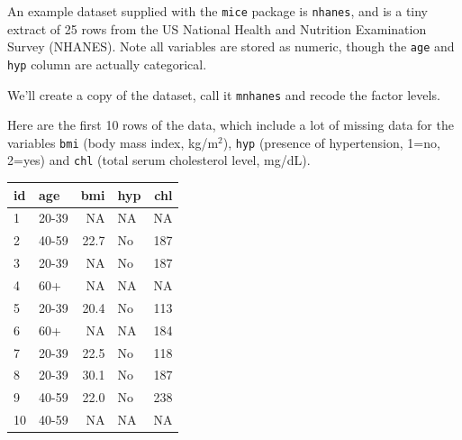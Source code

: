 \documentclass[
]{book}
\newenvironment{Shaded}{\begin{snugshade}}{\end{snugshade}}
\newcommand{\AttributeTok}[1]{\textcolor[rgb]{0.13,0.29,0.53}{#1}}
\newcommand{\DecValTok}[1]{\textcolor[rgb]{0.00,0.00,0.81}{#1}}
\newcommand{\FunctionTok}[1]{\textcolor[rgb]{0.13,0.29,0.53}{\textbf{#1}}}
\newcommand{\NormalTok}[1]{#1}
\newcommand{\OtherTok}[1]{\textcolor[rgb]{0.56,0.35,0.01}{#1}}
\newcommand{\SpecialCharTok}[1]{\textcolor[rgb]{0.81,0.36,0.00}{\textbf{#1}}}
\newcommand{\StringTok}[1]{\textcolor[rgb]{0.31,0.60,0.02}{#1}}
\begin{document}
An example dataset supplied with the \texttt{mice} package is \texttt{nhanes}, and is a tiny
extract of 25 rows from the US National Health and Nutrition Examination Survey
(NHANES). Note all variables are stored as numeric, though the \texttt{age} and \texttt{hyp} column
are actually categorical.

We'll create a copy of the dataset, call it \texttt{mnhanes} and recode the factor levels.

\begin{Shaded}
\end{Shaded}

Here are the first 10 rows of the data, which include a lot of missing
data for the variables \texttt{bmi} (body mass index, kg/m\(^2\)), \texttt{hyp} (presence of hypertension, 1=no, 2=yes)
and \texttt{chl} (total serum cholesterol level, mg/dL).

\begin{table}
\centering
\begin{tabular}[t]{l|l|r|l|r}
\hline
id & age & bmi & hyp & chl\\
\hline
1 & 20-39 & NA & NA & NA\\
\hline
2 & 40-59 & 22.7 & No & 187\\
\hline
3 & 20-39 & NA & No & 187\\
\hline
4 & 60+ & NA & NA & NA\\
\hline
5 & 20-39 & 20.4 & No & 113\\
\hline
6 & 60+ & NA & NA & 184\\
\hline
7 & 20-39 & 22.5 & No & 118\\
\hline
8 & 20-39 & 30.1 & No & 187\\
\hline
9 & 40-59 & 22.0 & No & 238\\
\hline
10 & 40-59 & NA & NA & NA\\
\hline
\end{tabular}
\end{table}
\end{document}
